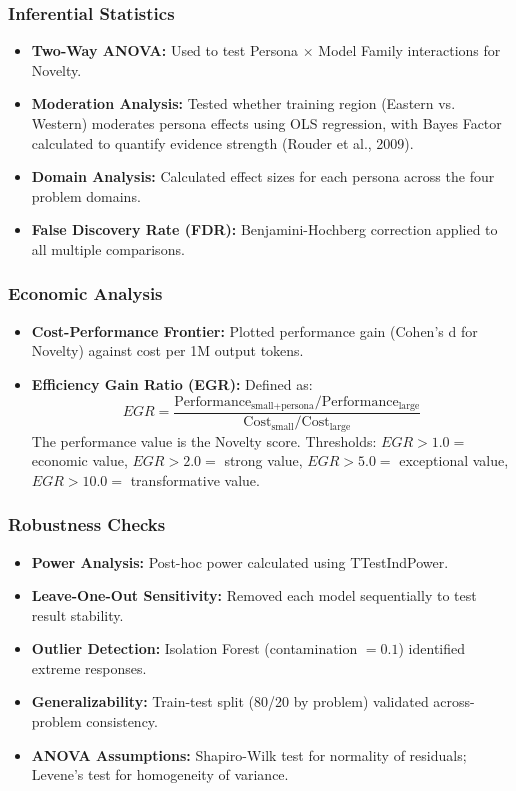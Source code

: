 \documentclass{article}
\begin{document}
\subsubsection{Inferential Statistics}

\begin{itemize}
    \item \textbf{Two-Way ANOVA:} Used to test Persona $\times$ Model Family interactions for Novelty.
    \item \textbf{Moderation Analysis:} Tested whether training region (Eastern vs. Western) moderates persona effects using OLS regression, with Bayes Factor calculated to quantify evidence strength (Rouder et al., 2009).
    \item \textbf{Domain Analysis:} Calculated effect sizes for each persona across the four problem domains.
    \item \textbf{False Discovery Rate (FDR):} Benjamini-Hochberg correction applied to all multiple comparisons.
\end{itemize}

\subsubsection{Economic Analysis}

\begin{itemize}
    \item \textbf{Cost-Performance Frontier:} Plotted performance gain (Cohen's d for Novelty) against cost per 1M output tokens.
    \item \textbf{Efficiency Gain Ratio (EGR):} Defined as:
    \begin{equation}
    EGR = \frac{\text{Performance}_{\text{small+persona}} / \text{Performance}_{\text{large}}}{\text{Cost}_{\text{small}} / \text{Cost}_{\text{large}}}
    \end{equation}
    The performance value is the Novelty score.
    Thresholds: $EGR > 1.0 =$ economic value, $EGR > 2.0 =$ strong value, $EGR > 5.0 =$ exceptional value, $EGR > 10.0 =$ transformative value.
\end{itemize}

\subsubsection{Robustness Checks}

\begin{itemize}
    \item \textbf{Power Analysis:} Post-hoc power calculated using TTestIndPower.
    \item \textbf{Leave-One-Out Sensitivity:} Removed each model sequentially to test result stability.
    \item \textbf{Outlier Detection:} Isolation Forest (contamination $= 0.1$) identified extreme responses.
    \item \textbf{Generalizability:} Train-test split (80/20 by problem) validated across-problem consistency.
    \item \textbf{ANOVA Assumptions:} Shapiro-Wilk test for normality of residuals; Levene's test for homogeneity of variance.
\end{itemize}
\end{document}

